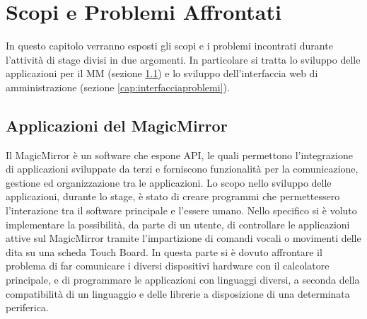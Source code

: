 \chapter{Scopi e Problemi Affrontati}\label{capitolo1}
In questo capitolo verranno esposti gli scopi e i problemi incontrati durante l'attivit\`a di stage divisi in due argomenti.
In particolare si tratta lo sviluppo delle applicazioni per il MM (sezione \ref{cap:moduliproblemi}) e lo sviluppo dell'interfaccia web
di amministrazione (sezione \ref{cap:interfacciaproblemi}).

\section{Applicazioni del MagicMirror}\label{cap:moduliproblemi}
Il MagicMirror \`e un software che espone API, le quali permettono
l'integrazione di applicazioni sviluppate da terzi e forniscono funzionalit\`a per la comunicazione, gestione
ed organizzazione tra le applicazioni.
Lo scopo nello sviluppo delle applicazioni, durante lo stage, \`e stato
di creare programmi che permettessero l'interazione tra il software principale
e l'essere umano. Nello specifico si \`e voluto implementare la possibilit\`a, da parte di un utente,
di controllare le applicazioni attive sul MagicMirror tramite l'impartizione di comandi vocali
o movimenti delle dita su una scheda Touch Board.
In questa parte si \`e dovuto affrontare il problema di far comunicare
i diversi dispositivi hardware con il calcolatore principale, e di programmare
le applicazioni con linguaggi diversi, a seconda della compatibilit\`a di un linguaggio
e delle librerie a disposizione di una determinata periferica.
\\[2\baselineskip]

